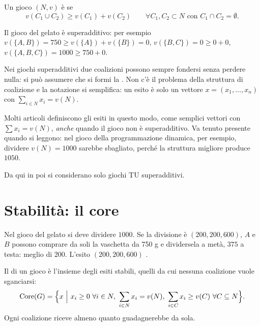 \begin{definizione}
Un gioco $(N,v)$ è  se
\[
  v(C_1 \cup C_2) \ge v(C_1) + v(C_2)
  \qquad \forall C_1, C_2 \subset N \text{ con } C_1 \cap C_2 = \emptyset .
\]
\end{definizione}

Il gioco del gelato è superadditivo: per esempio $v(\{A,B\}) = 750 \ge v(\{A\}) + v(\{B\}) = 0$,
$v(\{B,C\}) = 0 \ge 0 + 0$, $v(\{A,B,C\}) = 1000 \ge 750 + 0$.

Nei giochi superadditivi due coalizioni possono sempre fondersi senza perdere nulla: si può
assumere che si formi la . Non c'è il problema della struttura di
coalizione e la notazione si semplifica: un esito è solo un vettore
$x = (x_1,\dots,x_n)$ con $\sum_{i\in N} x_i = v(N)$.

\begin{osservazione}
Molti articoli definiscono gli esiti in questo modo, come semplici vettori con
$\sum x_i = v(N)$, \emph{anche} quando il gioco non è superadditivo. Va tenuto presente
quando si leggono: nel gioco della programmazione dinamica, per esempio, dividere $v(N)=1000$
sarebbe sbagliato, perché la struttura migliore produce $1050$.
\end{osservazione}

Da qui in poi si considerano solo giochi TU superadditivi.

\section{Stabilità: il core}

Nel gioco del gelato si deve dividere $1000$. Se la divisione è $(200, 200, 600)$, $A$ e $B$
possono comprare da soli la vaschetta da 750 g e dividersela a metà, $375$ a testa: meglio
di $200$. L'esito $(200,200,600)$ .

\begin{definizione}[Core]
Il  di un gioco è l'insieme degli esiti stabili, quelli da cui nessuna coalizione
vuole sganciarsi:
\[
  \operatorname{Core}(G) = \Bigl\{ x \ \Big|\ x_i \ge 0\ \forall i \in N,\
  \sum_{i \in N} x_i = v(N),\
  \sum_{i \in C} x_i \ge v(C)\ \forall C \subseteq N \Bigr\}.
\]
Ogni coalizione riceve almeno quanto guadagnerebbe da sola.
\end{definizione}

